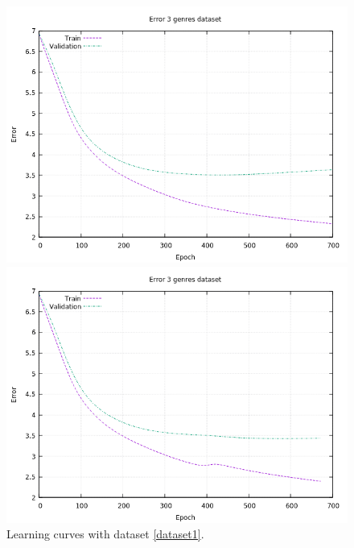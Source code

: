 \begin{figure}[H]
	\centering
	\begin{minipage}[t]{0.5\linewidth}
		\includegraphics[width=\linewidth]{img/Plot/full/plot_full_64_0_drop.png}
	\end{minipage}%
	\begin{minipage}[t]{0.5\linewidth}
		\includegraphics[width=\linewidth]{img/Plot/full/plot_full_64_0.1_drop.png}
	\end{minipage}
	\caption{Learning curves with dataset \ref{dataset1}.}
	\label{fig:d1}
\end{figure}
